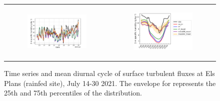 \begin{figure}[hbtp]
\begin{tabular}{cc}
        \begin{subfigure}[t]{0.5\textwidth}
            \caption{}
            \includegraphics[width=\textwidth]{images/chap5/SOP_TS_DC/time_series_elsplans_q2m.png}
        \end{subfigure} &
        \begin{subfigure}[t]{0.5\textwidth}
            \caption{}
            \includegraphics[width=\textwidth]{images/chap5/SOP_TS_DC/diurnal_cycle_elsplans_q2m.png}
        \end{subfigure} \\
    \end{tabular}
    \caption{Time series and mean diurnal cycle of surface turbulent fluxes at Els Plans (rainfed site), July 14-30 2021. The envelope for \mesomean represents the 25th and 75th percentiles of the distribution.}
    \label{fig:elsplans_surfacevars}
\end{figure}

